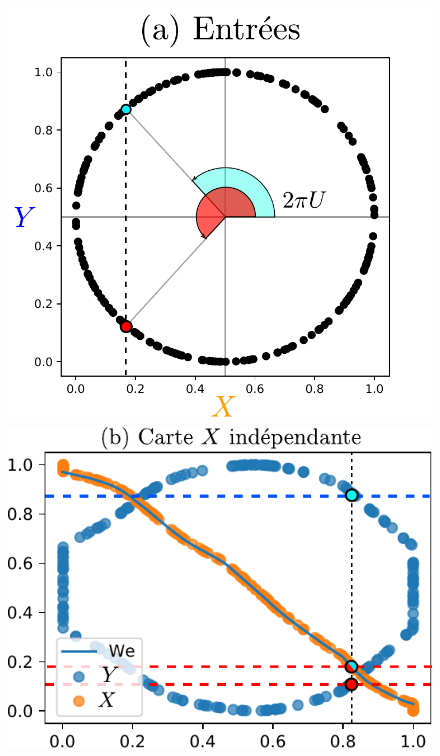 \begin{figure}
\begin{minipage}{0.27\textwidth}
\includegraphics[width=\textwidth]{2som_inp.pdf}
\end{minipage}
\begin{minipage}{0.34\textwidth}
\includegraphics[width=\textwidth]{weights_2som_unco.pdf}
\end{minipage}
\begin{minipage}{0.38\textwidth}

\end{minipage}
\end{figure}
